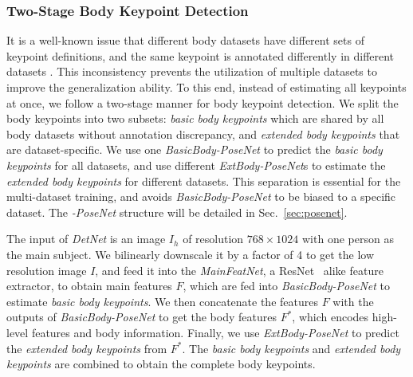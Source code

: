\documentclass[final]{cvpr}
\begin{document}
\subsubsection{Two-Stage Body Keypoint Detection\vspace{-1mm}}
It is a well-known issue that different body datasets have different sets of keypoint definitions, and the same keypoint is annotated differently in different datasets \cite{joo2018total}.
This inconsistency prevents the utilization of multiple datasets to improve the generalization ability.
To this end, instead of estimating all keypoints at once, we follow a two-stage manner for body keypoint detection.
We split the body keypoints into two subsets: \textit{basic body keypoints} which are shared by all body datasets without annotation discrepancy, and \textit{extended body keypoints} that are dataset-specific.
We use one \textit{BasicBody-PoseNet} to predict the \textit{basic body keypoints} for all datasets, and use different \textit{ExtBody-PoseNet}s to estimate the \textit{extended body keypoints} for different datasets.
This separation is essential for the multi-dataset training, and avoids \textit{BasicBody-PoseNet} to be biased to a specific dataset.
The \textit{-PoseNet} structure will be detailed in Sec.~\ref{sec:posenet}.
\par
The input of \textit{DetNet} is an image $I_h$ of resolution $768 \times 1024$ with one person as the main subject.
We bilinearly downscale it by a factor of 4 to get the low resolution image $I$, and feed it into the \textit{MainFeatNet}, a ResNet~\cite{he2016deep} alike feature extractor, to obtain main features $F$, which are fed into \textit{BasicBody-PoseNet} to estimate \textit{basic body keypoints}.
We then concatenate the features $F$ with the outputs of \textit{BasicBody-PoseNet} to get the body features $F^{*}$, which encodes high-level features and body information.
Finally, we use \textit{ExtBody-PoseNet} to predict the \textit{extended body keypoints} from $F^{*}$.
The \textit{basic body keypoints} and \textit{extended body keypoints} are combined to obtain the complete body keypoints.
\par
\vspace{-3mm}
\end{document}
